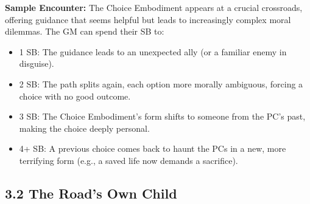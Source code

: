 \documentclass[11pt]{article}
\begin{document}
\textbf{Sample Encounter:} The Choice Embodiment appears at a crucial crossroads, offering guidance that seems helpful but leads to increasingly complex moral dilemmas. The GM can spend their SB to:
\begin{itemize}
\item 1 SB: The guidance leads to an unexpected ally (or a familiar enemy in disguise).
\item 2 SB: The path splits again, each option more morally ambiguous, forcing a choice with no good outcome.
\item 3 SB: The Choice Embodiment's form shifts to someone from the PC's past, making the choice deeply personal.
\item 4+ SB: A previous choice comes back to haunt the PCs in a new, more terrifying form (e.g., a saved life now demands a sacrifice).
\end{itemize}

\clearpage

\subsection*{3.2 The Road's Own Child}
\end{document}
